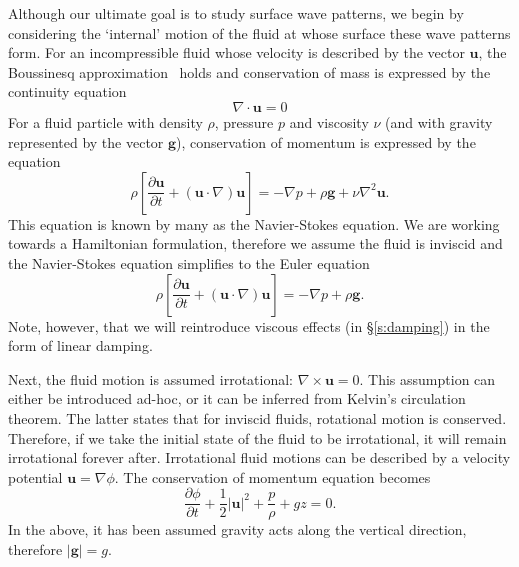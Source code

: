Although our ultimate goal is to study surface wave patterns, we begin by considering the `internal' motion of the fluid at whose surface these wave patterns form. For an incompressible fluid whose velocity is described by the vector $\boldsymbol{u}$, the Boussinesq approximation~\citep{kundu90:_fluid_mechan} holds and conservation of mass is expressed by the continuity equation
\begin{equation}
\nabla \cdot \boldsymbol{u}= 0 \label{e:Cons Mass}
\end{equation}
For a fluid particle with density $\rho$, pressure $p$ and viscosity $\nu$ (and with gravity represented by the vector $\boldsymbol{g}$), conservation of momentum is expressed by the equation
\begin{equation}
\rho \left[ \frac{\partial \boldsymbol{u}}{\partial t} + (\boldsymbol{u} \cdot \nabla )\boldsymbol{u} \right] = - \nabla p + \rho \boldsymbol{g}+ \nu \nabla^2 \boldsymbol{u}. 
\end{equation}
This equation is known by many as the Navier-Stokes equation. We are working towards a Hamiltonian formulation, therefore we assume the fluid is inviscid and the Navier-Stokes equation simplifies to the Euler equation
\begin{equation}
\rho \left[ \frac{\partial \boldsymbol{u}}{\partial t} + (\boldsymbol{u} \cdot \nabla )\boldsymbol{u} \right] = - \nabla p + \rho \boldsymbol{g}.
\end{equation}
Note, however, that we will reintroduce viscous effects (in \S\ref{s:damping}) in the form of linear damping.

Next, the fluid motion is assumed irrotational: $\nabla \times \boldsymbol{u}= 0$. This assumption can either be introduced ad-hoc, or it can be inferred from Kelvin's circulation theorem. The latter states that for inviscid fluids, rotational motion is conserved. Therefore, if we take the initial state of the fluid to be irrotational, it will remain irrotational forever after. Irrotational fluid motions can be described by a velocity potential $\boldsymbol{u}= \nabla \phi$. The conservation of momentum equation becomes
\begin{equation}
\frac{\partial \phi}{\partial t} + \frac12 |\boldsymbol{u}|^2 + \frac{p}{\rho} + g z = 0.
\end{equation}
In the above, it has been assumed gravity acts along the vertical direction, therefore $|\boldsymbol{g}|=g$.


